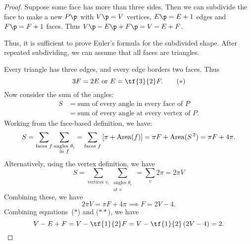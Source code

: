 \begin{proof}
	Suppose some face has more than three sides. Then we can subdivide the face to make a new $P\p$ with $V\p=V$ vertices, $E\p=E+1$ edges and $F\p=F+1$ faces. Thus $V\p-E\p+F\p = V-E+F$. %
	
	\begin{center}
	\end{center}

	Thus, it is sufficient to prove Euler's formula for the subdivided shape. After repeated subdividing, we can assume that all faces are triangles. %

	Every triangle has three edges, and every edge borders two faces. Thus
	\begin{equation*}
		3F=2E \text{ or } E=\tf{3}{2}F. \tag{$*$}
	\end{equation*}
	Now consider the sum of the angles:
	\begin{align*}
		S
		&= \text{sum of every angle in every face of $P$} \\
		&= \text{sum of every angle at every vertex of $P$}.
	\end{align*}
	Working from the face-based definition, we have:
	\begin{equation*}
		S
		= \sum_{\text{faces $f$}} \sum_{\substack{\text{angles $\theta_i$} \\ \text{in $f$}}}
		= \sum_{\text{faces $f$}} \left[ \pi+\operatorname{Area}(f) \right]
		=\pi F + \operatorname{Area}(S^{\,2}) = \pi F + 4\pi.
	\end{equation*}
	Alternatively, using the vertex definition, we have
	\begin{equation*}
		S
		=\sum_{\text{vertices $v_i$}} \sum_{\substack{\text{angles $\theta_i$} \\ \text{at $v$}}}
		= \sum_v 2\pi = 2\pi V
	\end{equation*}
	Combining these, we have
	\begin{equation*}
		2\pi V = \pi F + 4\pi \implies F=2V-4. \tag{$**$}
	\end{equation*}
	Combining equations~($*$) and ($**$), we have
	\begin{equation*}
		V-E+F = V-\tf{1}{2}F = V-\tf{1}{2}\left( 2V-4 \right) = 2. \qedhere
	\end{equation*}
\end{proof}

